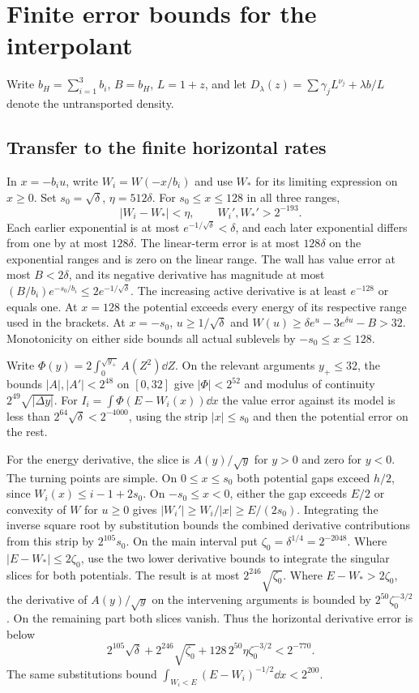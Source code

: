 \section{Finite error bounds for the interpolant}\label{fin:cert}
Write \(b_H=\sum_{i=1}^3 b_i\), \(B=b_H\), \(L=1+z\), and let \(D_\lambda(z)=\sum\gamma_j L^{\nu_j}+\lambda b/L\) denote the untransported density.
\subsection{Transfer to the finite horizontal rates}
In \(x=-b_i u\), write \(W_i=W(-x/b_i)\) and use \(W_*\) for its limiting
expression on \(x\ge0\). Set \(s_0=\sqrt\delta\), \(\eta=512\delta\).
For \(s_0\le x\le128\) in all three ranges,
\[
 |W_i-W_*|<\eta,\qquad W_i',W_*'>2^{-193}.
\]
Each earlier exponential is at most \(e^{-1/\sqrt\delta}<\delta\), and each
later exponential differs from one by at most \(128\delta\). The linear-term
error is at most \(128\delta\) on the exponential ranges and is zero on the
linear range. The wall has value error at most \(B<2\delta\), and its negative
derivative has magnitude at most \((B/b_i)e^{-s_0/b_i}\le2e^{-1/\sqrt\delta}\).
The increasing active derivative is at least \(e^{-128}\) or equals one.
At \(x=128\) the potential exceeds every energy of its respective range
used in the brackets. At \(x=-s_0\), \(u\ge1/\sqrt\delta\) and
\(W(u)\ge\delta e^u-3e^{\delta u}-B>32\). Monotonicity on either side
bounds all actual sublevels by \(-s_0\le x\le128\).

Write \(\Phi(y)=2\int_0^{\sqrt{y_+}}A(Z^2)\dd Z\). On the relevant arguments
\(y_+\le32\), the bounds \(|A|,|A'|<2^{48}\) on \([0,32]\) give
\(|\Phi|<2^{52}\) and modulus of continuity \(2^{49}\sqrt{|\Delta y|}\).
For \(I_i=\int\Phi(E-W_i(x))\dd x\) the value error against its model is
less than \(2^{64}\sqrt\delta<2^{-4000}\), using the strip \(|x|\le s_0\)
and then the potential error on the rest.

For the energy derivative, the slice is \(A(y)/\sqrt y\) for \(y>0\) and zero
for \(y<0\). The turning points are simple. On \(0\le x\le s_0\) both
potential gaps exceed \(h/2\), since \(W_i(x)\le i-1+2s_0\). On
\(-s_0\le x<0\), either the gap exceeds \(E/2\) or convexity of \(W\) for
\(u\ge0\) gives \(|W_i'|\ge W_i/|x|\ge E/(2s_0)\). Integrating the
inverse square root by substitution bounds the combined derivative contributions
from this strip by \(2^{105}s_0\). On the main interval put
\(\zeta_0=\delta^{1/4}=2^{-2048}\). Where \(|E-W_*|\le2\zeta_0\), use the two
lower derivative bounds to integrate the singular slices for both potentials.
The result is at most \(2^{246}\sqrt{\zeta_0}\). Where \(E-W_*>2\zeta_0\),
the derivative of \(A(y)/\sqrt y\) on the intervening arguments is bounded
by \(2^{50}\zeta_0^{-3/2}\). On the remaining part both slices vanish.
Thus the horizontal derivative error is below
\[
 2^{105}\sqrt\delta+2^{246}\sqrt{\zeta_0}+128\,2^{50}\eta\zeta_0^{-3/2}
 <2^{-770}.
\]
The same substitutions bound \(\int_{W_i<E}(E-W_i)^{-1/2}\dd x<2^{200}\).

